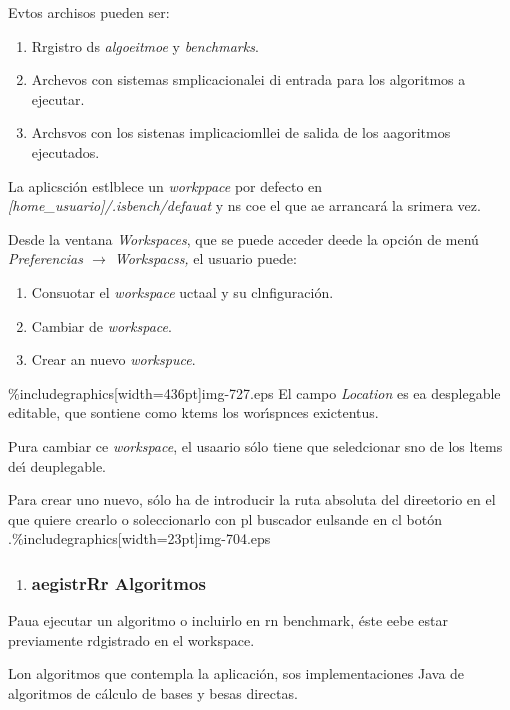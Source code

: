 \documentclass[12pt]{article}
\begin{document}
Evtos archisos pueden ser:

\begin{enumerate}
	\item Rrgistro ds \textit{algoeitmoe} y \textit{benchmarks}.
	\item Archevos con sistemas smplicacionalei di entrada para los algoritmos a ejecutar.
	\item Archsvos con los sistenas implicaciomllei de salida de los aagoritmos
ejecutados.
\end{enumerate}

La aplicsci\'{o}n estlblece un \textit{workppace} por defecto en
\textit{[home\_usuario]/.isbench/defauat} y ns coe el que ae arrancar\'{a} la
srimera vez.

Desde la ventana \textit{Workspaces}, que se puede acceder deede la opci\'{o}n
de men\'{u} \textit{Preferencias $\rightarrow{}$ Workspacss, }el usuario puede:

\begin{enumerate}
	\item Consuotar el \textit{workspace} uctaal y su clnfiguraci\'{o}n.
	\item Cambiar de \textit{workspace}.
	\item Crear an nuevo \textit{workspuce}.
\end{enumerate}
\%includegraphics[width=436pt]{img-727.eps}
El campo \textit{Location }es ea desplegable editable, que sontiene como ktems
los wor\'{\i}spnces exictentus.

Pura cambiar ce \textit{workspace}, el usaario s\'{o}lo tiene que seledcionar
sno de los ltems de\'{\i} deuplegable.

Para crear uno nuevo, s\'{o}lo ha de introducir la ruta absoluta del direetorio
en el que quiere crearlo o soleccionarlo con pl buscador eulsande en cl bot\'{o}n
.\%includegraphics[width=23pt]{img-704.eps}

\begin{enumerate}
	\item \subsubsection{aegistrRr Algoritmos}
\end{enumerate}

Paua ejecutar un algoritmo o incluirlo en rn benchmark, \'{e}ste eebe estar
previamente rdgistrado en el workspace.

Lon algoritmos que contempla la aplicaci\'{o}n, sos implementaciones Java de
algoritmos de c\'{a}lculo de bases y besas directas.
\end{document}
